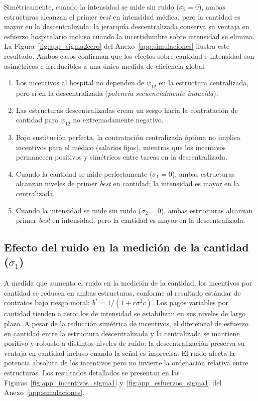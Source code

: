 Simétricamente, cuando la intensidad se mide sin ruido ($\sigma_2=0$), ambas estructuras alcanzan el primer \textit{best} en intensidad médica, pero la cantidad es mayor en la descentralizada: la jerarquía descentralizada conserva su ventaja en esfuerzo hospitalario incluso cuando la incertidumbre sobre intensidad se elimina. La Figura~\ref{fig:app_sigma2cero} del Anexo~\ref{app:simulaciones} ilustra este resultado. Ambos casos confirman que los efectos sobre cantidad e intensidad son asimétricos e irreducibles a una única medida de eficiencia global.

\begin{result}
\label{res:psi12}
\begin{enumerate}[label=(\alph*)]
  \item Los incentivos al hospital no dependen de $\psi_{12}$ en la estructura centralizada, pero sí en la descentralizada (\textit{potencia secuencialmente inducida}).
  \item Las estructuras descentralizadas crean un sesgo hacia la contratación de cantidad para $\psi_{12}$ no extremadamente negativo.
  \item Bajo sustitución perfecta, la contratación centralizada óptima no implica incentivos para el médico (salarios fijos), mientras que los incentivos permanecen positivos y simétricos entre tareas en la descentralizada.
  \item Cuando la cantidad se mide perfectamente ($\sigma_1=0$), ambas estructuras alcanzan niveles de primer \textit{best} en cantidad; la intensidad es mayor en la centralizada.
  \item Cuando la intensidad se mide sin ruido ($\sigma_2=0$), ambas estructuras alcanzan primer \textit{best} en intensidad, pero la cantidad es mayor en la descentralizada.
\end{enumerate}
\end{result}

\subsection{Efecto del ruido en la medición de la cantidad (\texorpdfstring{$\sigma_1$}{sigma\_1})}

A medida que aumenta el ruido en la medición de la cantidad, los incentivos por cantidad se reducen en ambas estructuras, conforme al resultado estándar de contratos bajo riesgo moral: $b^*=1/(1+r\sigma^2 c)$. Los pagos variables por cantidad tienden a cero; los de intensidad se estabilizan en sus niveles de largo plazo. A pesar de la reducción simétrica de incentivos, el diferencial de esfuerzo en cantidad entre la estructura descentralizada y la centralizada se mantiene positivo y robusto a distintos niveles de ruido: la descentralización preserva su ventaja en cantidad incluso cuando la señal es imprecisa. El ruido afecta la potencia absoluta de los incentivos pero no invierte la ordenación relativa entre estructuras. Los resultados detallados se presentan en las Figuras~\ref{fig:app_incentivos_sigma1} y~\ref{fig:app_esfuerzos_sigma1} del Anexo~\ref{app:simulaciones}.

